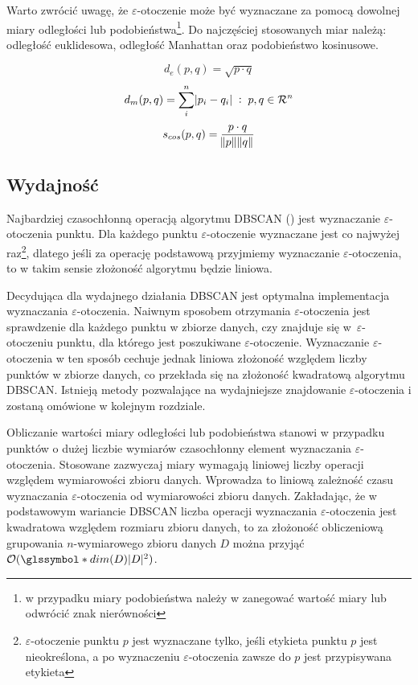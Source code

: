 Warto zwrócić uwagę, że $ \varepsilon $-otoczenie może być wyznaczane za pomocą dowolnej miary odległości lub podobieństwa\footnote{w przypadku miary podobieństwa należy w  zanegować wartość miary lub odwrócić znak nierówności}. Do najczęściej stosowanych miar należą: odległość euklidesowa, odległość Manhattan oraz podobieństwo kosinusowe.
\smallskip

\begin{equation}
	d_e(p, q) = \sqrt{p \cdot q}
\end{equation}
\begin{equation}
d_m(p, q) = \sum_i^{n}{\abs{p_i-q_i}} \;:\; p,q\in \mathcal{R}^n
\end{equation}
\begin{equation}
s_{cos}(p, q) = \frac{p \cdot q}{\norm{p}\norm{q}}
\end{equation}



\subsection{Wydajność}
Najbardziej czasochłonną operacją algorytmu DBSCAN () jest wyznaczanie $ \varepsilon $-otoczenia punktu. Dla każdego punktu $ \varepsilon $-otoczenie wyznaczane jest co najwyżej raz\footnote{$ \varepsilon $-otoczenie punktu $ p $ jest wyznaczane tylko, jeśli etykieta punktu $ p $ jest nieokreślona, a  po wyznaczeniu $ \varepsilon $-otoczenia zawsze do $ p $ jest przypisywana etykieta}, dlatego jeśli za operację podstawową przyjmiemy wyznaczanie $ \varepsilon $-otoczenia, to w takim sensie złożoność algorytmu będzie liniowa.

Decydująca dla wydajnego działania DBSCAN jest optymalna implementacja wyznaczania $ \varepsilon $-otoczenia. Naiwnym sposobem otrzymania $ \varepsilon $-otoczenia jest sprawdzenie dla każdego punktu w zbiorze danych, czy znajduje się \mbox{w $ \varepsilon $-otoczeniu} punktu, dla którego jest poszukiwane $ \varepsilon $-otoczenie. Wyznaczanie $ \varepsilon $-otoczenia w ten sposób cechuje jednak liniowa złożoność względem liczby punktów w zbiorze danych, co przekłada się na złożoność kwadratową algorytmu DBSCAN. Istnieją metody pozwalające na wydajniejsze znajdowanie $ \varepsilon $-otoczenia i zostaną omówione w kolejnym rozdziale.

Obliczanie wartości miary odległości lub podobieństwa stanowi w przypadku punktów o dużej liczbie wymiarów czasochłonny element wyznaczania $ \varepsilon $-otoczenia. Stosowane zazwyczaj miary wymagają liniowej liczby operacji względem wymiarowości zbioru danych. Wprowadza to liniową zależność czasu wyznaczania $ \varepsilon $-otoczenia od wymiarowości zbioru danych. Zakładając, że w podstawowym wariancie DBSCAN liczba operacji wyznaczania $ \varepsilon $-otoczenia jest kwadratowa względem rozmiaru zbioru danych, to za złożoność obliczeniową grupowania $ n $-wymiarowego zbioru danych $ D $ można przyjąć $ \mathcal{O}(\s{dim}(D)|D|^2) $.